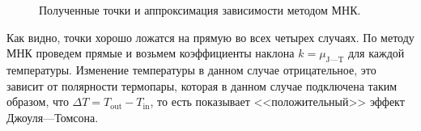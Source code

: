\documentclass[a4paper,12pt]{report}
\begin{document}
\begin{figure}[H]
        \caption{Полученные точки и аппроксимация зависимости методом МНК.}
    \end{figure}
    Как видно, точки хорошо ложатся на прямую во всех четырех случаях. По методу МНК проведем прямые и возьмем коэффициенты наклона $k=\mu_{\text{J---T}}$ для каждой температуры. Изменение температуры в данном случае отрицательное, это зависит от полярности термопары, которая в данном случае подключена таким образом, что $\Delta T=T_\text{out}-T_\text{in}$, то есть показывает <<положительный>> эффект Джоуля---Томсона.
    \newpage
\end{document}
